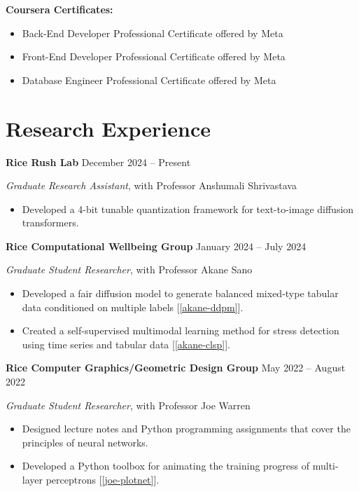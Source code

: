 \documentclass[11pt]{article}
\begin{document}
\vspace{\lineskip}

\textbf{Coursera Certificates:}

\begin{itemize}
    \item Back-End Developer Professional Certificate offered by Meta
    \item Front-End Developer Professional Certificate offered by Meta
    \item Database Engineer Professional Certificate offered by Meta
\end{itemize}

\section*{Research Experience}

\textbf{Rice Rush Lab} \hfill December 2024 -- Present

\textit{Graduate Research Assistant}, with Professor Anshumali Shrivastava

\begin{itemize}
    \item Developed a 4-bit tunable quantization framework for text-to-image diffusion transformers.
\end{itemize}

\vspace{\lineskip}

\textbf{Rice Computational Wellbeing Group} \hfill January 2024 -- July 2024

\textit{Graduate Student Researcher}, with Professor Akane Sano

\begin{itemize}
    \item Developed a fair diffusion model to generate balanced mixed-type tabular data conditioned on multiple labels [\ref{akane-ddpm}].
    \item Created a self-supervised multimodal learning method for stress detection using time series and tabular data [\ref{akane-clsp}].
\end{itemize}

\vspace{\lineskip}

\textbf{Rice Computer Graphics/Geometric Design Group} \hfill May 2022 -- August 2022

\textit{Graduate Student Researcher}, with Professor Joe Warren

\begin{itemize}
    \item Designed lecture notes and Python programming assignments that cover the principles of neural networks.
    \item Developed a Python toolbox for animating the training progress of multi-layer perceptrons [\ref{joe-plotnet}].
\end{itemize}
\end{document}
